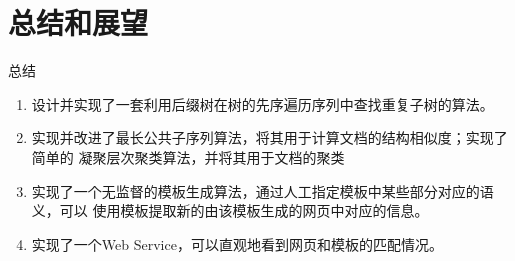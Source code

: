 \section{总结和展望}
\label{sec-4}
\begin{frame}[label=sec-4-1]{总结}
\begin{enumerate}[<+->]
\item 设计并实现了一套利用后缀树在树的先序遍历序列中查找重复子树的算法。
\item 实现并改进了最长公共子序列算法，将其用于计算文档的结构相似度；实现了简单的
凝聚层次聚类算法，并将其用于文档的聚类
\item 实现了一个无监督的模板生成算法，通过人工指定模板中某些部分对应的语义，可以
使用模板提取新的由该模板生成的网页中对应的信息。
\item 实现了一个Web Service，可以直观地看到网页和模板的匹配情况。
\end{enumerate}
\end{frame}

